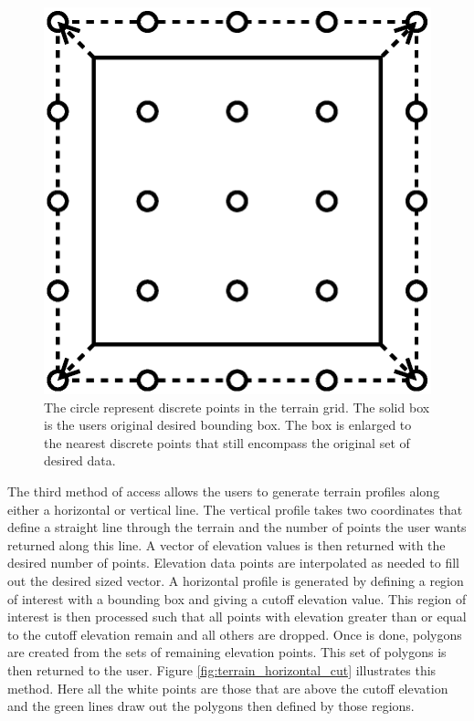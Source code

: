 \begin{figure}[ht]
\centering
\includegraphics{images/network_vis/terrain_bounding_box.eps}
  \caption{The circle represent discrete points in the terrain grid.  The solid box is the users original desired bounding box.  The box is enlarged to the nearest discrete points that still encompass the original set of desired data.}
\label{fig:terrain_bb}
\end{figure}

The third method of access allows the users to generate terrain profiles along either a horizontal or vertical line.  The vertical profile takes two coordinates that define a straight line through the terrain and the number of points the user wants returned along this line.  A vector of elevation values is then returned with the desired number of points.  Elevation data points are interpolated as needed to fill out the desired sized vector.  A horizontal profile is generated by defining a region of interest with a bounding box and giving a cutoff elevation value.  This region of interest is then processed such that all points with elevation greater than or equal to the cutoff elevation remain and all others are dropped.  Once is done, polygons are created from the sets of remaining elevation points.  This set of polygons is then returned to the user.  Figure \ref{fig:terrain_horizontal_cut} illustrates this method.  Here all the white points are those that are above the cutoff elevation and the green lines draw out the polygons then defined by those regions.

